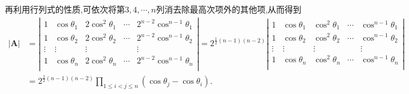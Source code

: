 \documentclass[../../main.tex]{subfiles}%
\begin{document}
\begin{solution}
再利用行列式的性质,可依次将第\(3,4,\cdots,n\)列消去除最高次项外的其他项,从而得到
\begin{align*}
|\boldsymbol{A}|&=\left| \begin{matrix}
1&		\cos \theta _1&		2\cos ^2\theta _1&		\cdots&		2^{n-2}\cos ^{n-1}\theta _1\\
1&		\cos \theta _2&		2\cos ^2\theta _2&		\cdots&		2^{n-2}\cos ^{n-1}\theta _2\\
\vdots&		\vdots&		\vdots&		&		\vdots\\
1&		\cos \theta _n&		2\cos ^2\theta _n&		\cdots&		2^{n-2}\cos ^{n-1}\theta _n\\
\end{matrix} \right|=2^{\frac{1}{2}(n-1)(n-2)}\left| \begin{matrix}
1&		\cos \theta _1&		\cos ^2\theta _1&		\cdots&		\cos ^{n-1}\theta _1\\
1&		\cos \theta _2&		\cos ^2\theta _2&		\cdots&		\cos ^{n-1}\theta _2\\
\vdots&		\vdots&		\vdots&		&		\vdots\\
1&		\cos \theta _n&		\cos ^2\theta _n&		\cdots&		\cos ^{n-1}\theta _n\\
\end{matrix} \right|
\\
&=2^{\frac{1}{2}(n-1)(n-2)}\prod_{1\leqslant i<j\leqslant n}{\left( \cos \theta _j-\cos \theta _i \right)}.
\end{align*}

\end{solution}
\end{document}
